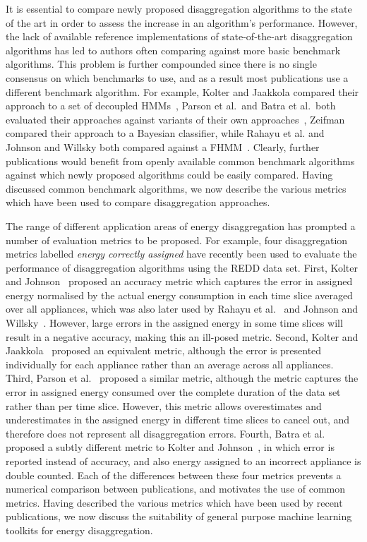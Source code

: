 \documentclass{sig-alternate}
\newcommand{\bluecolor}[1]{\textcolor{blue}{#1}}
\begin{document}
It is essential to compare newly proposed disaggregation algorithms to the state of the art in order to assess the increase in an algorithm's performance. However, the lack of available reference implementations of state-of-the-art disaggregation algorithms has led to authors often comparing against more basic benchmark algorithms. This problem is further compounded since there is no single consensus on which benchmarks to use, and as a result most publications use a different benchmark algorithm. For example, Kolter and Jaakkola compared their approach to a set of decoupled HMMs~\cite{kolter_2012}, Parson et al.\ and Batra et al.\ both evaluated their approaches against variants of their own approaches~\cite{parson_2012,batra_2013}, Zeifman compared their approach to a Bayesian classifier, while Rahayu et al. and Johnson and Willsky both compared against a FHMM~\cite{rahayu_2012,johnson_2013}. Clearly, further publications would benefit from openly available common benchmark algorithms against which newly proposed algorithms could be easily compared. Having discussed common benchmark algorithms, we now describe the various metrics which have been used to compare disaggregation approaches.

The range of different application areas of energy disaggregation has prompted a number of evaluation metrics to be proposed. For example, four disaggregation metrics labelled \emph{energy correctly assigned} have recently been used to evaluate the performance of disaggregation algorithms using the REDD data set. First, Kolter and Johnson~\cite{REDD} proposed an accuracy metric which captures the error in assigned energy normalised by the actual energy consumption in each time slice averaged over all appliances, which was also later used by Rahayu et al.~\cite{rahayu_2012} and Johnson and Willsky~\cite{johnson_2013}. However, large errors in the assigned energy in some time slices will result in a negative accuracy, making this an ill-posed metric. Second, Kolter and Jaakkola~\cite{kolter_2012} proposed an equivalent metric, although the error is presented individually for each appliance rather than an average across all appliances. Third, Parson et al.~\cite{parson_2012} proposed a similar metric, although the metric captures the error in assigned energy consumed over the complete duration of the data set rather than per time slice. However, this metric allows overestimates and underestimates in the assigned energy in different time slices to cancel out, and therefore does not represent all disaggregation errors. Fourth, Batra et al.~\cite{batra_2013} proposed a subtly different metric to Kolter and Johnson~\cite{REDD}, in which error is reported instead of accuracy, and also energy assigned to an incorrect appliance is double counted. Each of the differences between these four metrics prevents a numerical comparison between publications, and motivates the use of common metrics. Having described the various metrics which have been used by recent publications, we now discuss the suitability of general purpose machine learning toolkits for energy disaggregation.
\end{document}
